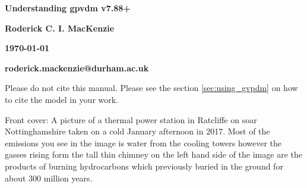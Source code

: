 \color{white}





\begin{titlepage}
   \begin{center}
      \Huge\textbf{Understanding gpvdm v7.88+}
   \end{center}

   \begin{center}
      \large\textbf{Roderick C. I. MacKenzie}
   \end{center}

   \begin{center}
      \large\textbf{\monthdayyeardate\today}
   \end{center}
   \begin{center}
      \large\textbf{roderick.mackenzie@durham.ac.uk}
   \end{center}

\addtolength{\wpXoffset}{-10cm}
\end{titlepage}

\setcounter{question}{0}




\color{black}


\newpage

\ClearWallPaper

\vspace*{\fill}
Please do not cite this manual.  Please see the section \ref{sec:using_gvpdm} on how to cite the model in your work.
\vspace*{\fill}


Front cover: A picture of a thermal power station in Ratcliffe on soar Nottinghamshire taken on a cold January afternoon in 2017. Most of the emissions you see in the image is water from the cooling towers however the gasses rising form the tall thin chimney on the left hand side of the image are the products of burning hydrocarbons which previously buried in the ground for about 300 million years.
